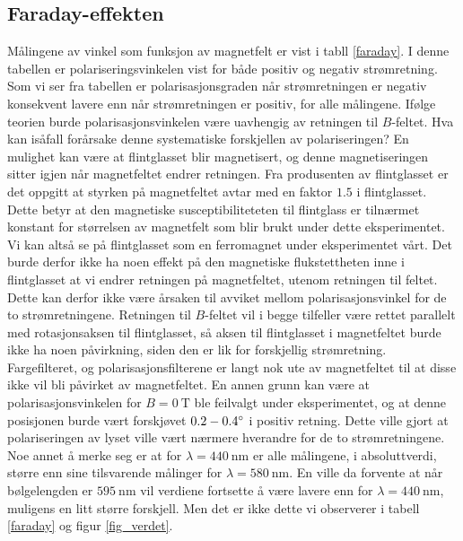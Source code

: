 \documentclass[%
 reprint,
 amsmath,amssymb,
 aps,
 norsk,
]{revtex4-1}
\begin{document}
\subsection{Faraday-effekten}
Målingene av vinkel som funksjon av magnetfelt er vist i tabll \vref{faraday}. I denne tabellen er polariseringsvinkelen vist for både positiv og negativ strømretning. Som vi ser fra tabellen er polarisasjonsgraden når strømretningen er negativ konsekvent lavere enn når strømretningen er positiv, for alle målingene. Ifølge teorien burde polarisasjonsvinkelen være uavhengig av retningen til $B$-feltet. Hva kan isåfall forårsake denne systematiske forskjellen av polariseringen? En mulighet kan være at flintglasset blir magnetisert, og denne magnetiseringen sitter igjen når magnetfeltet endrer retningen. Fra produsenten av flintglasset er det oppgitt at styrken på magnetfeltet avtar med en faktor $1.5$ i flintglasset. Dette betyr at den magnetiske susceptibiliteteten til flintglass er tilnærmet konstant for størrelsen av magnetfelt som blir brukt under dette eksperimentet. Vi kan altså se på flintglasset som en ferromagnet under eksperimentet vårt. Det burde derfor ikke ha noen effekt på den magnetiske flukstettheten inne i flintglasset at vi endrer retningen på magnetfeltet, utenom retningen til feltet. Dette kan derfor ikke være årsaken til avviket mellom polarisasjonsvinkel for de to strømretningene. Retningen til $B$-feltet vil i begge tilfeller være rettet parallelt med rotasjonsaksen til flintglasset, så aksen til flintglasset i magnetfeltet burde ikke ha noen påvirkning, siden den er lik for forskjellig strømretning. Fargefilteret, og polarisasjonsfilterene er langt nok ute av magnetfeltet til at disse ikke vil bli påvirket av magnetfeltet. En annen grunn kan være at polarisasjonsvinkelen for $B=\SI{0}{\tesla}$ ble feilvalgt under eksperimentet, og at denne posisjonen burde vært forskjøvet $0.2-0.4\degree$ i positiv retning. Dette ville gjort at polariseringen av lyset ville vært nærmere hverandre for de to strømretningene.\\
Noe annet å merke seg er at for $\lambda=\SI{440}{\nano\meter}$ er alle målingene, i absoluttverdi, større enn sine tilsvarende målinger for $\lambda=\SI{580}{\nano\meter}$. En ville da forvente at når bølgelengden er  $\SI{595}{\nano\meter}$ vil verdiene fortsette å være lavere enn for $\lambda = \SI{440}{\nano\meter}$, muligens en litt større forskjell. Men det er ikke dette vi observerer i tabell \vref{faraday} og figur \vref{fig_verdet}.
\end{document}
